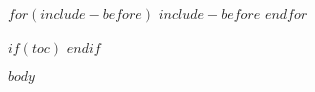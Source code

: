 \documentclass[10pt]{article}
\begin{document}
$for(include-before)$
$include-before$
$endfor$

$if(toc)$
{
  \setcounter{tocdepth}{$toc-depth$}
  \tableofcontents
  \clearpage
}
$endif$

$body$
\end{document}
